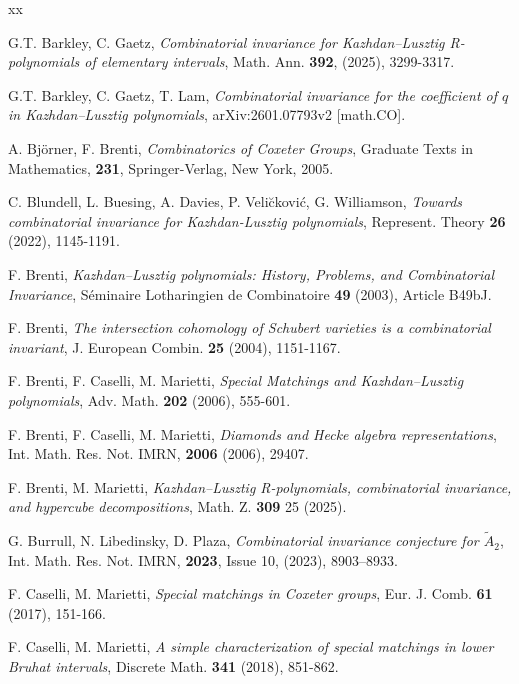 \documentclass[12pt,reqno]{amsart}
\theoremstyle{plain}
\theoremstyle{definition}
\theoremstyle{remark}
\begin{document}
\begin{thebibliography}{xx}

G.T. Barkley, C.  Gaetz, {\em Combinatorial invariance for Kazhdan–Lusztig R-polynomials of elementary intervals}, Math. Ann. {\bf 392}, (2025), 3299-3317.  %

G.T. Barkley, C.  Gaetz, T. Lam, {\em Combinatorial invariance for the coefficient of $q$ in Kazhdan--Lusztig polynomials},  arXiv:2601.07793v2 [math.CO].


A. Bj\"{o}rner, F. Brenti, {\em Combinatorics of Coxeter Groups}, Graduate Texts in Mathematics, {\bf 231}, Springer-Verlag, New York, 2005.

 C. Blundell,  L. Buesing, A. Davies,  P. Veli\u ckovi\'c, G. Williamson, {\em  Towards combinatorial invariance for Kazhdan-Lusztig polynomials}, Represent. Theory {\bf 26} (2022), 1145-1191.

F. Brenti, {\em Kazhdan--Lusztig polynomials: History, Problems, and Combinatorial Invariance}, S\'eminaire Lotharingien de Combinatoire {\bf 49} (2003), Article B49bJ.

F. Brenti, 
{\em The intersection cohomology of Schubert varieties is a combinatorial invariant}, 
J. European Combin. {\bf 25} (2004), 1151-1167.

F. Brenti, F. Caselli, M. Marietti, {\em Special Matchings and Kazhdan--Lusztig polynomials},  Adv. Math. {\bf 202} (2006), 555-601.

F. Brenti, F. Caselli, M. Marietti, {\em Diamonds and Hecke algebra representations}, Int. Math. Res. Not. IMRN, {\bf 2006} (2006), 29407.

F. Brenti, M. Marietti, {\em Kazhdan--Lusztig R-polynomials, combinatorial invariance, and hypercube decompositions}, Math. Z. {\bf 309} 25 (2025).

G. Burrull, N. Libedinsky, D. Plaza, 
{\em Combinatorial invariance conjecture for $\tilde{A}_2$}, Int. Math. Res. Not. IMRN, {\bf 2023}, Issue 10, (2023), 8903–8933.

F. Caselli, M. Marietti, {\em Special matchings in Coxeter groups},  Eur. J. Comb. {\bf 61} (2017), 151-166.

F. Caselli, M. Marietti, {\em A simple characterization of special matchings in lower Bruhat intervals}, Discrete Math. {\bf 341} (2018), 851-862.


\end{thebibliography}
\end{document}
